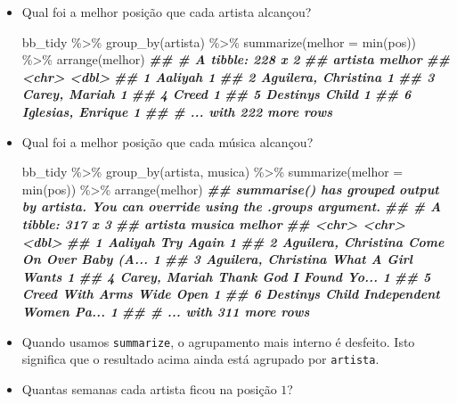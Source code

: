 \documentclass[
  11pt]{report}
\newenvironment{Shaded}{\begin{snugshade}}{\end{snugshade}}
\newcommand{\AttributeTok}[1]{\textcolor[rgb]{0.77,0.63,0.00}{#1}}
\newcommand{\DocumentationTok}[1]{\textcolor[rgb]{0.56,0.35,0.01}{\textbf{\textit{#1}}}}
\newcommand{\FunctionTok}[1]{\textcolor[rgb]{0.00,0.00,0.00}{#1}}
\newcommand{\NormalTok}[1]{#1}
\newcommand{\SpecialCharTok}[1]{\textcolor[rgb]{0.00,0.00,0.00}{#1}}
\renewenvironment{Shaded}{
    \begin{mdframed}[%
      roundcorner=2pt,%
      innerleftmargin=5pt,%
      innerrightmargin=5pt,%
      topline=true,%
      leftline=true,%
      rightline=true,%
      bottomline=true,%
      linewidth=0.5pt,%
      linecolor=black!20,%
      backgroundcolor=black!2,%
      skipabove=2ex,%
      skipbelow=2.5ex%
    ]%
  }
  {
    \end{mdframed}
  }
\begin{document}
\begin{itemize}
\item
  Qual foi a melhor posição que cada artista alcançou?

\begin{Shaded}
\begin{Highlighting}[]
\NormalTok{bb\_tidy }\SpecialCharTok{\%\textgreater{}\%} 
  \FunctionTok{group\_by}\NormalTok{(artista) }\SpecialCharTok{\%\textgreater{}\%} 
  \FunctionTok{summarize}\NormalTok{(}\AttributeTok{melhor =} \FunctionTok{min}\NormalTok{(pos)) }\SpecialCharTok{\%\textgreater{}\%} 
  \FunctionTok{arrange}\NormalTok{(melhor)}
\DocumentationTok{\#\# \# A tibble: 228 x 2}
\DocumentationTok{\#\#   artista             melhor}
\DocumentationTok{\#\#   \textless{}chr\textgreater{}                \textless{}dbl\textgreater{}}
\DocumentationTok{\#\# 1 Aaliyah                  1}
\DocumentationTok{\#\# 2 Aguilera, Christina      1}
\DocumentationTok{\#\# 3 Carey, Mariah            1}
\DocumentationTok{\#\# 4 Creed                    1}
\DocumentationTok{\#\# 5 Destiny\textquotesingle{}s Child          1}
\DocumentationTok{\#\# 6 Iglesias, Enrique        1}
\DocumentationTok{\#\# \# ... with 222 more rows}
\end{Highlighting}
\end{Shaded}
\item
  Qual foi a melhor posição que cada música alcançou?

\begin{Shaded}
\begin{Highlighting}[]
\NormalTok{bb\_tidy }\SpecialCharTok{\%\textgreater{}\%} 
  \FunctionTok{group\_by}\NormalTok{(artista, musica) }\SpecialCharTok{\%\textgreater{}\%} 
  \FunctionTok{summarize}\NormalTok{(}\AttributeTok{melhor =} \FunctionTok{min}\NormalTok{(pos)) }\SpecialCharTok{\%\textgreater{}\%} 
  \FunctionTok{arrange}\NormalTok{(melhor)}
\DocumentationTok{\#\# \textasciigrave{}summarise()\textasciigrave{} has grouped output by \textquotesingle{}artista\textquotesingle{}. You can override using the \textasciigrave{}.groups\textasciigrave{} argument.}
\DocumentationTok{\#\# \# A tibble: 317 x 3}
\DocumentationTok{\#\#   artista             musica                  melhor}
\DocumentationTok{\#\#   \textless{}chr\textgreater{}               \textless{}chr\textgreater{}                    \textless{}dbl\textgreater{}}
\DocumentationTok{\#\# 1 Aaliyah             Try Again                    1}
\DocumentationTok{\#\# 2 Aguilera, Christina Come On Over Baby (A...      1}
\DocumentationTok{\#\# 3 Aguilera, Christina What A Girl Wants            1}
\DocumentationTok{\#\# 4 Carey, Mariah       Thank God I Found Yo...      1}
\DocumentationTok{\#\# 5 Creed               With Arms Wide Open          1}
\DocumentationTok{\#\# 6 Destiny\textquotesingle{}s Child     Independent Women Pa...      1}
\DocumentationTok{\#\# \# ... with 311 more rows}
\end{Highlighting}
\end{Shaded}
\item
  Quando usamos \texttt{summarize}, o agrupamento mais interno é desfeito. Isto significa que o resultado acima ainda está agrupado por \texttt{artista}.
\item
  Quantas semanas cada artista ficou na posição $1$?


\end{itemize}
\end{document}
